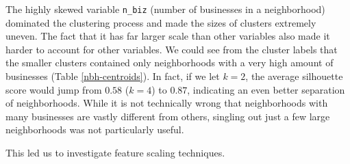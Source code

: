 \documentclass[compsoc]{IEEEtran}
\begin{document}
The highly skewed variable \texttt{n\_biz} (number of businesses in a neighborhood) dominated the clustering process and made the sizes of clusters extremely uneven. The fact that it has far larger scale than other variables also made it harder to account for other variables. We could see from the cluster labels that the smaller clusters contained only neighborhoods with a very high amount of businesses (Table \ref{nbh-centroids}). In fact, if we let $k = 2$, the average silhouette score would jump from $0.58$ ($k = 4$) to $0.87$, indicating an even better separation of neighborhoods. While it is not technically wrong that neighborhoods with many businesses are vastly different from others, singling out just a few large neighborhoods was not particularly useful.

This led us to investigate feature scaling techniques.
\end{document}
